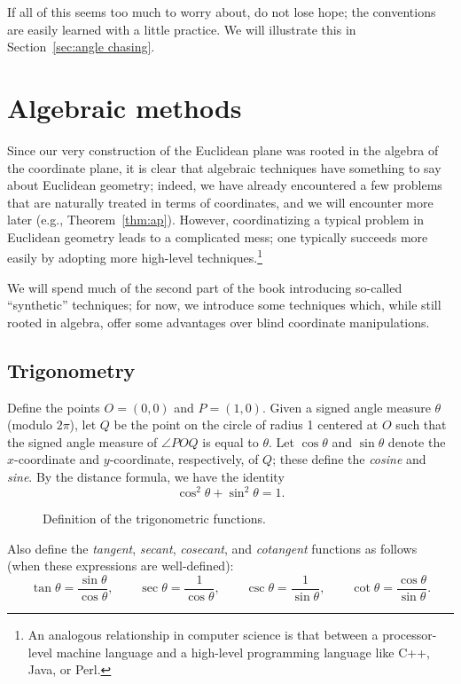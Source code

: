 \documentclass[12pt]{book}
\numberwithin{exc}{section}
\numberwithin{figure}{section}
\numberwithin{equation}{theorem}
\begin{document}
If all of 
this seems too much to worry about, do not lose hope; the conventions 
are easily learned with a little practice. We will illustrate this
in Section~\ref{sec:angle chasing}.

\chapter{Algebraic methods}

Since our very construction of the Euclidean plane was rooted in
the algebra of the coordinate plane, it is clear that algebraic techniques
have something to say about Euclidean geometry; indeed, we have already encountered a few problems that are naturally treated in terms of coordinates,
and we will encounter more later (e.g., Theorem~\ref{thm:ap}).
However, coordinatizing a typical problem in Euclidean geometry leads 
to a complicated mess; one typically succeeds more easily by adopting more high-level techniques.\footnote{An analogous relationship in computer science is that between a processor-level machine language and a high-level programming language like C++, Java, or Perl.}

We will spend much of the second part of the book introducing so-called ``synthetic'' techniques; for now, we introduce some techniques which, while still rooted in algebra, offer some advantages over blind coordinate manipulations.

\section{Trigonometry}

Define the points $O = (0,0)$ and $P = (1,0)$.
Given a signed angle measure $\theta$ (modulo $2\pi$),
let $Q$ be the point on the circle of radius 1 centered at $O$ such that
the signed angle measure of $\angle POQ$ is equal to $\theta$. Let
$\cos \theta$ and $\sin \theta$ denote the $x$-coordinate and
$y$-coordinate, respectively, of $Q$; these define the \emph{cosine}
 and \emph{sine}.  By the distance
formula, we have the identity
\[
\cos^2 \theta + \sin^2 \theta = 1.
\]
\begin{figure}[ht]
\caption{Definition of the trigonometric functions.}
\end{figure}

Also define
the \emph{tangent},  \emph{secant},  \emph{cosecant},  and \emph{cotangent}  functions as follows (when these expressions
are well-defined):
\[
\tan \theta  = \frac{\sin \theta}{\cos \theta}, \qquad
\sec \theta = \frac{1}{\cos \theta}, \qquad
\csc \theta = \frac{1}{\sin \theta}, \qquad
\cot \theta = \frac{\cos \theta}{\sin \theta}.
\]
\end{document}
